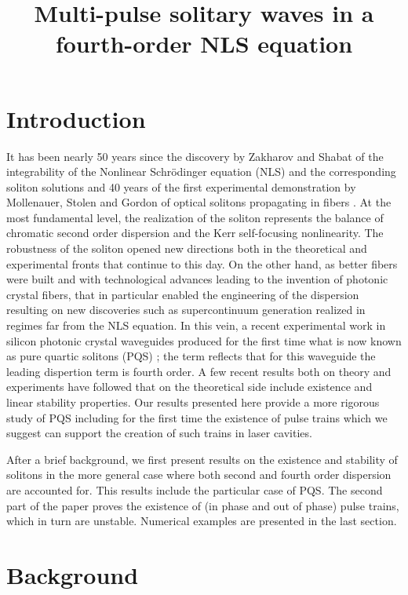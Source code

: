 \documentclass[12pt]{article}
\title{Multi-pulse solitary waves in a fourth-order NLS equation}
\begin{document}
\maketitle

\section{Introduction}
It has been nearly 50 years since the discovery by Zakharov and Shabat \cite{Zak72} of the integrability of the Nonlinear Schr\"odinger equation (NLS) and the corresponding soliton solutions and 40 years of the first experimental demonstration by Mollenauer, Stolen and Gordon of optical solitons propagating in fibers \cite{Moll80}. At the most fundamental level, the realization of the soliton represents the balance of chromatic second order dispersion and the Kerr self-focusing nonlinearity. The robustness of the soliton opened new directions both in the theoretical and experimental fronts that continue to this day. On the other hand, as better fibers were built and with technological advances leading to the invention of photonic crystal fibers, that in particular enabled the engineering of the dispersion resulting on new discoveries such as supercontinuum generation realized in regimes far from the NLS equation.   
In this vein, a recent experimental work in silicon photonic
crystal waveguides produced for the first time what is now known as pure quartic solitons (PQS) \cite{BlancoPQS}; the term reflects that for this waveguide the leading dispertion term is fourth order. A few recent results both on theory and experiments have followed \cite{Tam2019, Tam2020} that on the theoretical side include existence and linear stability properties. Our results presented here provide a more rigorous study of PQS including for the first time the existence of pulse trains which we suggest can support the creation of such trains in laser cavities.

\noindent
After a brief background, we first present results on the existence and stability of solitons in the more general case where both second and fourth order dispersion are accounted for. This results include the particular case of PQS. The second part of the paper proves the existence of (in phase and out of phase) pulse trains, which in turn are unstable. Numerical examples are presented in the last section.


\section{Background}
\end{document}
